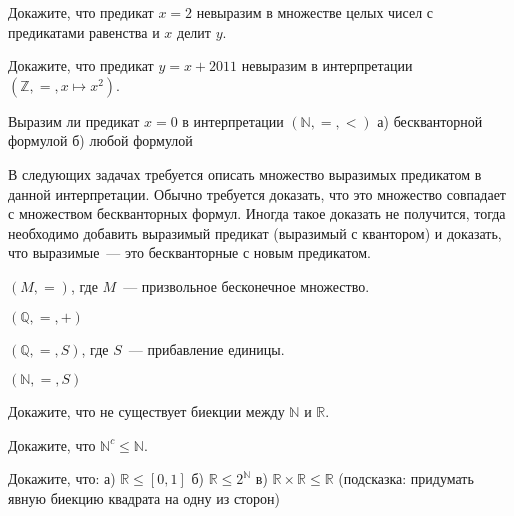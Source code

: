 \setcounter{curtask}{14}



\begin{task}
    Докажите, что предикат $x = 2$ невыразим в множестве целых чисел с
    предикатами равенства и $x$ делит $y$.
\end{task}

\begin{task}
    Докажите, что предикат $y = x + 2011$ невыразим в интерпретации
    $(\mathbb{Z}, =, x \mapsto x^2)$.
\end{task}

\begin{task}
    Выразим ли предикат $x = 0$ в интерпретации $(\mathbb{N}, =, <)$
    а) бескванторной формулой
    б) любой формулой
\end{task}

В следующих задачах требуется описать множество выразимых предикатом в
данной интерпретации. Обычно требуется доказать, что это множество
совпадает с множеством бескванторных формул. Иногда такое доказать не
получится, тогда необходимо добавить выразимый предикат (выразимый с
квантором) и доказать, что выразимые~--- это бескванторные с новым
предикатом.

\begin{task}
    $(M, =)$, где $M$~--- призвольное бесконечное множество.
\end{task}

\begin{task}
    $(\mathbb{Q}, =, +)$
\end{task}

\begin{task}
    $(\mathbb{Q}, =, S)$, где $S$~--- прибавление единицы.
\end{task}

\begin{task}
    $(\mathbb{N}, =, S)$
\end{task}


\breakline


\begin{ptask}{1}
    Докажите, что не существует биекции между $\mathbb{N}$ и $\mathbb{R}$.
\end{ptask}

\begin{ptask}{2}
    Докажите, что $\mathbb{N}^c \le \mathbb{N}$.
\end{ptask}

\begin{ptask}{3}
    Докажите, что:
    а) $\mathbb{R} \le [0, 1]$
    б) $\mathbb{R} \le 2^{\mathbb{N}}$
    в) $\mathbb{R} \times \mathbb{R} \le \mathbb{R}$ (подсказка:
	    придумать явную биекцию квадрата на одну из сторон)
\end{ptask}

